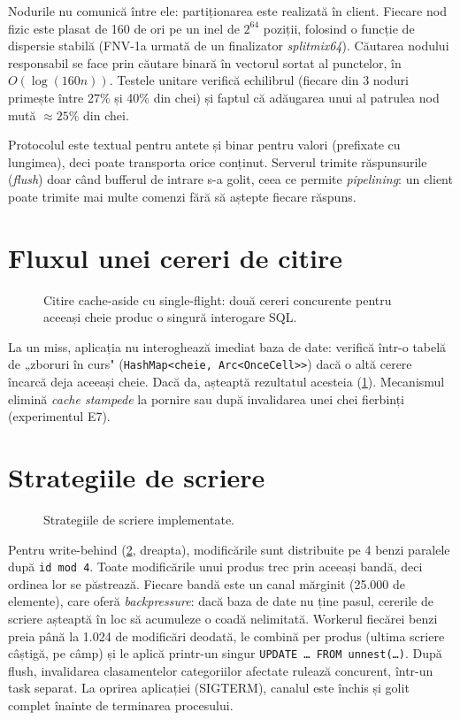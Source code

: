 Nodurile nu comunică între ele: partiționarea este realizată în client. Fiecare nod fizic este plasat
de 160 de ori pe un inel de $2^{64}$ poziții, folosind o funcție de dispersie stabilă (FNV-1a urmată de
un finalizator \emph{splitmix64}). Căutarea nodului responsabil se face prin căutare binară în vectorul
sortat al punctelor, în $O(\log(160n))$. Testele unitare verifică echilibrul (fiecare din 3 noduri
primește între 27\% și 40\% din chei) și faptul că adăugarea unui al patrulea nod mută
$\approx 25\%$ din chei.

Protocolul este textual pentru antete și binar pentru valori (prefixate cu lungimea), deci poate
transporta orice conținut. Serverul trimite răspunsurile (\emph{flush}) doar când bufferul de intrare
s-a golit, ceea ce permite \emph{pipelining}: un client poate trimite mai multe comenzi fără să aștepte
fiecare răspuns.

\section{Fluxul unei cereri de citire}

\begin{figure}[H]
  \centering
  \resizebox{0.95\linewidth}{!}{}
  \caption{Citire cache-aside cu single-flight: două cereri concurente pentru aceeași cheie produc o
           singură interogare SQL.}
  \label{fig:readpath}
\end{figure}

La un miss, aplicația nu interoghează imediat baza de date: verifică într-o tabelă de „zboruri în
curs" (\texttt{HashMap<cheie, Arc<OnceCell>>}) dacă o altă cerere încarcă deja aceeași cheie. Dacă da,
așteaptă rezultatul acesteia (\cref{fig:readpath}). Mecanismul elimină \emph{cache stampede} la pornire
sau după invalidarea unei chei fierbinți (experimentul E7).

\section{Strategiile de scriere}

\begin{figure}[H]
  \centering
  \resizebox{\linewidth}{!}{}
  \caption{Strategiile de scriere implementate.}
  \label{fig:writes}
\end{figure}

Pentru write-behind (\cref{fig:writes}, dreapta), modificările sunt distribuite pe 4 benzi paralele după
\texttt{id mod 4}. Toate modificările unui produs trec prin aceeași bandă, deci ordinea lor se păstrează.
Fiecare bandă este un canal mărginit (25.000 de elemente), care oferă \emph{backpressure}: dacă baza de
date nu ține pasul, cererile de scriere așteaptă în loc să acumuleze o coadă nelimitată. Workerul fiecărei
benzi preia până la 1.024 de modificări deodată, le combină per produs (ultima scriere câștigă, pe câmp) și
le aplică printr-un singur \texttt{UPDATE \ldots{} FROM unnest(\ldots)}. După flush, invalidarea
clasamentelor categoriilor afectate rulează concurent, într-un task separat.
La oprirea aplicației (SIGTERM), canalul este închis și golit complet înainte de terminarea procesului.

